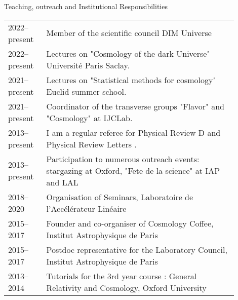\documentclass{resume} %
\begin{document}
\begin{rSection}{Teaching, outreach and Institutional Responsibilities}
\vspace{-0.4cm}
\begin{table}[h]
{\def\arraystretch{1.5}\tabcolsep=0pt
\begin{tabular}{p{0.15\linewidth}p{0.75\linewidth}}
2022--present &   Member of the scientific council DIM Universe  \\
2022--present &   Lectures on "Cosmology of the dark Universe"  Université Paris Saclay. \\
2021--present &   Lectures on "Statistical methods for cosmology"  Euclid summer school. \\
2021--present &  Coordinator of the transverse groups "Flavor" and "Cosmology" at IJCLab. \\
2013--present &  I am a regular referee for Physical Review D and Physical Review Letters .  \\
2013--present & Participation to numerous outreach events: stargazing at Oxford, "Fete de la science" at IAP and LAL \\
2018--2020 &  Organisation of Seminars, Laboratoire de l'Accélérateur Linéaire  \\
2015--2017 &  Founder and co-organiser of Cosmology Coffee, Institut Astrophysique de Paris  \\
2015--2017 &  Postdoc representative for the Laboratory Council, Institut Astrophysique de Paris \\
2013--2014 &  Tutorials for the 3rd year course : General Relativity and Cosmology, Oxford University \\
\end{tabular}%
}
\end{table}
\vspace{-0.6cm}
\end{rSection}
\end{document}
